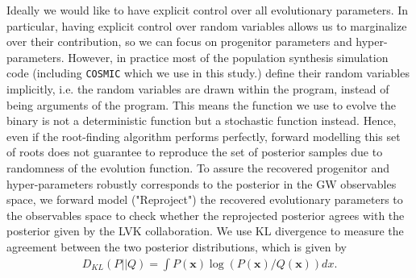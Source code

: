 \documentclass[twocolumn]{aastex631}
\newcommand{\kw}[1]{{\color{rb4}[KW: #1 ]}}
\begin{document}

Ideally we would like to have explicit control over all evolutionary parameters.
In particular, having explicit control over random variables allows us to marginalize over their contribution, so we can focus on progenitor parameters and hyper-parameters.
However, in practice most of the population synthesis simulation code (including \texttt{COSMIC} which we use in this study.) define their random variables implicitly,
i.e. the random variables are drawn within the program, instead of being arguments of the program.
This means the function we use to evolve the binary is not a deterministic function but a stochastic function instead. 
Hence, even if the root-finding algorithm performs perfectly,
forward modelling this set of roots does not guarantee to reproduce the set of posterior samples due to randomness of the evolution function.
To assure the recovered progenitor and hyper-parameters robustly corresponds to the posterior in the GW observables space,
we forward model ("Reproject") the recovered evolutionary parameters to the observables space to check whether the reprojected posterior agrees with the posterior given by the LVK collaboration.
We use KL divergence to measure the agreement between the two posterior distributions, which is given by
\begin{align}
D_{KL}(P||Q) = \int P(\bm{x}) \log(P(\bm{x})/Q(\bm{x})) dx.
\label{eq:KLdivergence}
\end{align}
\end{document}
